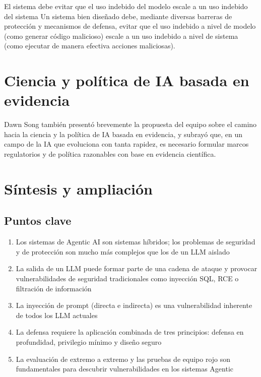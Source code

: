 \documentclass[a4paper]{article}
\begin{document}
\begin{warningbox}{El sistema debe evitar que el uso indebido del modelo escale a un uso indebido del sistema}
Un sistema bien diseñado debe, mediante diversas barreras de protección y mecanismos de defensa, evitar que el uso indebido a nivel de modelo (como generar código malicioso) escale a un uso indebido a nivel de sistema (como ejecutar de manera efectiva acciones maliciosas).
\end{warningbox}

\section{Ciencia y política de IA basada en evidencia}

Dawn Song también presentó brevemente la propuesta del equipo sobre el camino hacia la ciencia y la política de IA basada en evidencia, y subrayó que, en un campo de la IA que evoluciona con tanta rapidez, es necesario formular marcos regulatorios y de política razonables con base en evidencia científica.

\section{Síntesis y ampliación}

\subsection{Puntos clave}

\begin{enumerate}
    \item Los sistemas de Agentic AI son sistemas híbridos; los problemas de seguridad y de protección son mucho más complejos que los de un LLM aislado
    \item La salida de un LLM puede formar parte de una cadena de ataque y provocar vulnerabilidades de seguridad tradicionales como inyección SQL, RCE o filtración de información
    \item La inyección de prompt (directa e indirecta) es una vulnerabilidad inherente de todos los LLM actuales
    \item La defensa requiere la aplicación combinada de tres principios: defensa en profundidad, privilegio mínimo y diseño seguro
    \item La evaluación de extremo a extremo y las pruebas de equipo rojo son fundamentales para descubrir vulnerabilidades en los sistemas Agentic
\end{enumerate}
\end{document}
